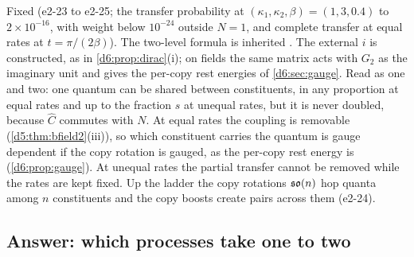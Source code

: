 Fixed (e2-23 to e2-25; the transfer probability at $(\kappa_1,\kappa_2,\beta)=(1,3,0.4)$ to $2\times10^{-16}$, with weight below $10^{-24}$
outside $N=1$, and complete transfer at equal rates at $t=\pi/(2\beta)$). The two-level formula is inherited \cite{Rabi37}. The external $i$ is
constructed, as in \cref{d6:prop:dirac}(i); on fields the same matrix acts with $G_2$ as the imaginary unit and gives the per-copy
rest energies of \cref{d6:sec:gauge}. Read as one and two: one quantum can be shared between constituents, in any proportion at equal
rates and up to the fraction $s$ at unequal rates, but it is never doubled, because $\hat C$ commutes with $N$. At equal rates the
coupling is removable (\cref{d5:thm:bfield2}(iii)), so which constituent carries the quantum is gauge dependent if the copy rotation is
gauged, as the per-copy rest energy is (\cref{d6:prop:gauge}). At unequal rates the partial transfer cannot be removed while the rates are kept fixed. Up the ladder the
copy rotations $\mathfrak{so}(n)$ hop quanta among $n$ constituents and the copy boosts create pairs across them (e2-24).

\subsection{Answer: which processes take one to two}
\label{e2:sec:answer}

